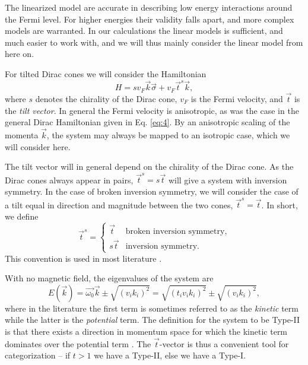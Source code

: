 The linearized model are accurate in describing low energy interactions around the Fermi level.
For higher energies their validity falls apart, and more complex models are warranted.
In our calculations the linear models is sufficient, and much easier to work with, and we will thus mainly consider the linear model from here on.

For tilted Dirac cones we will consider the Hamiltonian
\begin{equation}
  \label{eq:10}
  H =  s v_F \vec{k} \vec{\sigma} + v_F \vec{t}^s \vec{k},
\end{equation}
where \( s \) denotes the chirality of the Dirac cone, \( v_F \) is the Fermi velocity, and \( \vec{t} \) is the \emph{tilt vector}.
In general the Fermi velocity is anisotropic, as was the case in the general Dirac Hamiltonian given in Eq. \eqref{eq:4}.
By an anisotropic scaling of the momenta \( \vec{k} \), the system may always be mapped to an isotropic case, which we will consider here.

The tilt vector will in general depend on the chirality of the Dirac cone.
As the Dirac cones always appear in pairs, \( \vec{t}^s = s \vec{t} \) will give a system with inversion symmetry.
In the case of broken inversion symmetry, we will consider the case of a tilt equal in direction and magnitude between the two cones, \( \vec{t}^s = \vec{t} \).
In short, we define
\begin{equation}
  \vec{t}^s =
  \begin{cases}
    \vec{t} & \text{broken inversion symmetry},\\
    s \vec{t} & \text{inversion symmetry}.
  \end{cases}\label{eq:11}
\end{equation}
This convention is used in most literature \cite{vanderwurffMagnetovorticalThermoelectricTransport2019,ferreirosAnomalousNernstThermal2017}.

With no magnetic field, the eigenvalues of the system are
\begin{equation}
  \label{eq:12}
  E(\vec{k}) = \vec{\omega_{0}} \vec{k} \pm \sqrt{(v_{i} k_{i})^{2}} = \sqrt{(t_{i} v_{i} k_{i})^{2}} \pm \sqrt{(v_{i} k_{i})^{2}},
\end{equation}
where in the literature the first term is sometimes referred to as the \emph{kinetic} term while the latter is the \emph{potential} term.
The definition for the system to be Type-II is that there exists a direction in momentum space for which the kinetic term dominates over the potential term \cite{soluyanovTypeIIWeylSemimetals2015}.
The \(\vec{t}\)-vector is thus a convenient tool for categorization -- if \(t > 1\) we have a Type-II, else we have a Type-I.


